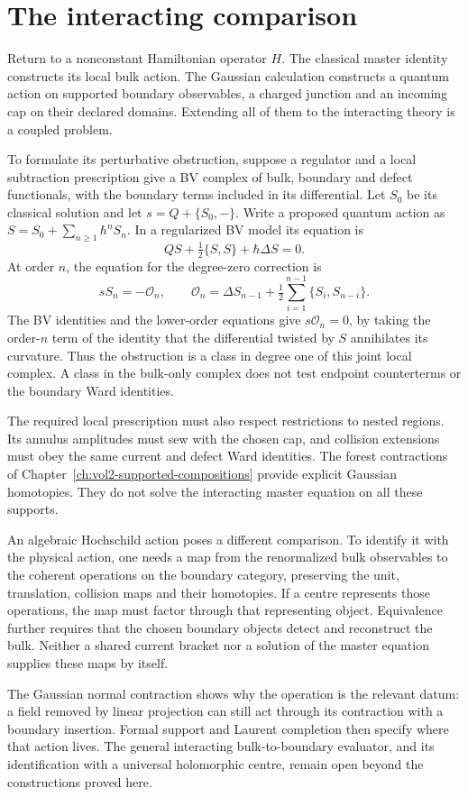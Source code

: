 \section{The interacting comparison}

Return to a nonconstant Hamiltonian operator \(H\).
The classical master identity constructs its local bulk action.
The Gaussian calculation constructs a quantum action on supported
boundary observables, a charged junction and an incoming cap on their
declared domains. Extending all of them to the interacting theory is
a coupled problem.

To formulate its perturbative obstruction, suppose a regulator and
a local subtraction prescription give a BV complex of bulk, boundary
and defect functionals, with the boundary terms included in its
differential. Let \(S_0\) be its classical solution and let
\(s=Q+\{S_0,-\}\). Write a proposed quantum action as
\(S=S_0+\sum_{n\geq1}\hbar^nS_n\).
In a regularized BV model its equation is
\begin{equation}\label{eq:vol2-native-joint-qme}
                 QS+\tfrac12\{S,S\}+\hbar\Delta S=0.
\end{equation}
At order \(n\), the equation for the degree-zero correction is
\[
 sS_n=-\mathcal O_n,
 \qquad
 \mathcal O_n=\Delta S_{n-1}
       +\tfrac12\sum_{i=1}^{n-1}\{S_i,S_{n-i}\}.
\]
The BV identities and the lower-order equations give
\(s\mathcal O_n=0\), by taking the order-\(n\) term of the identity
that the differential twisted by \(S\) annihilates its curvature.
Thus the obstruction is a class in degree one of this joint local
complex. A class in the bulk-only complex does not test endpoint
counterterms or the boundary Ward identities.

The required local prescription must also respect restrictions to
nested regions. Its annulus amplitudes must sew with the chosen cap,
and collision extensions must obey the same current and defect Ward
identities. The forest contractions of
Chapter~\ref{ch:vol2-supported-compositions} provide explicit Gaussian
homotopies. They do not solve the interacting master equation on all
these supports.

An algebraic Hochschild action poses a different comparison. To
identify it with the physical action, one needs a map from the
renormalized bulk observables to the coherent operations on the
boundary category, preserving the unit, translation, collision maps
and their homotopies. If a centre represents those operations, the map
must factor through that representing object. Equivalence further
requires that the chosen boundary objects detect and reconstruct the
bulk. Neither a shared current bracket nor a solution of the master
equation supplies these maps by itself.

The Gaussian normal contraction shows why the operation is the relevant
datum: a field removed by linear projection can still act through its
contraction with a boundary insertion. Formal support and Laurent
completion then specify where that action lives. The general interacting
bulk-to-boundary evaluator, and its identification with a universal
holomorphic centre, remain open beyond the constructions proved here.
